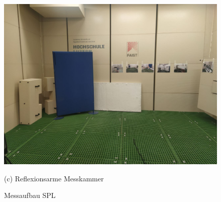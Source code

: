 \documentclass[12pt]{article}
\begin{document}
\begin{figure}[H]
\begin{minipage}
				{1\textwidth} \includegraphics[width=\linewidth]{Raum_leer} \caption*{(c) Reflexionsarme Messkammer} 
			\end{minipage} 
			\caption[]{Messaufbau SPL} \label{fig:messaufbau_spl} 
		\end{figure}
		
	\newpage
	\thispagestyle{empty} 
\end{document}
